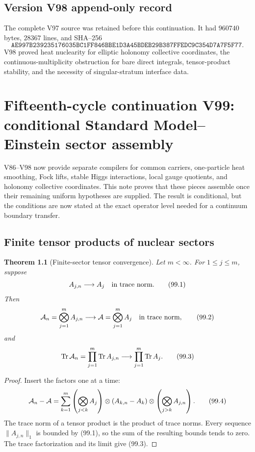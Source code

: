 \documentclass[11pt]{article}
\newtheorem{theorem}{Theorem}[section]
\theoremstyle{remark}
\begin{document}
\section*{Version V98 append-only record}
The complete V97 source was retained before this continuation.  It
had \(960740\) bytes, \(28367\) lines, and SHA--256
\[
 \texttt{AE997B239235176035BC1FF846BBE1D3A45BDEB29B387FFEDC9C354D7A7F5F77}.
\]
V98 proved heat nuclearity for elliptic holonomy collective
coordinates, the continuous-multiplicity obstruction for bare
direct integrals, tensor-product stability, and the necessity of
singular-stratum interface data.
\chapter{Fifteenth-cycle continuation V99: conditional Standard Model--Einstein sector assembly}
\label{sec:v15v99}

V86--V98 now provide separate compilers for common carriers,
one-particle heat smoothing, Fock lifts, stable Higgs interactions,
local gauge quotients, and holonomy collective coordinates.  This
note proves that these pieces assemble once their remaining uniform
hypotheses are supplied.  The result is conditional, but the
conditions are now stated at the exact operator level needed for a
continuum boundary transfer.

\section{Finite tensor products of nuclear sectors}

\begin{theorem}[Finite-sector tensor convergence]
\label{thm:v15v99-tensor}
Let \(m<\infty\).  For \(1\leq j\leq m\), suppose
\[
 A_{j,n}\longrightarrow A_j\quad\hbox{in trace norm}. \tag{99.1}
\]
Then
\[
 {\cal A}_n=\bigotimes_{j=1}^m A_{j,n}
 \longrightarrow
 {\cal A}=\bigotimes_{j=1}^m A_j
 \quad\hbox{in trace norm},                            \tag{99.2}
\]
and
\[
 \operatorname{Tr}{\cal A}_n
 =\prod_{j=1}^m\operatorname{Tr}A_{j,n}
 \longrightarrow
 \prod_{j=1}^m\operatorname{Tr}A_j.                   \tag{99.3}
\]
\end{theorem}

\begin{proof}
Insert the factors one at a time:
\[
 {\cal A}_n-{\cal A}
 =\sum_{k=1}^m
 \left(\bigotimes_{j<k}A_j\right)
 \otimes(A_{k,n}-A_k)
 \otimes\left(\bigotimes_{j>k}A_{j,n}\right).          \tag{99.4}
\]
The trace norm of a tensor product is the product of trace norms.
Every sequence \(\|A_{j,n}\|_1\) is bounded by (99.1), so the sum
of the resulting bounds tends to zero.  The trace factorization
and its limit give (99.3).
\end{proof}
\end{document}
